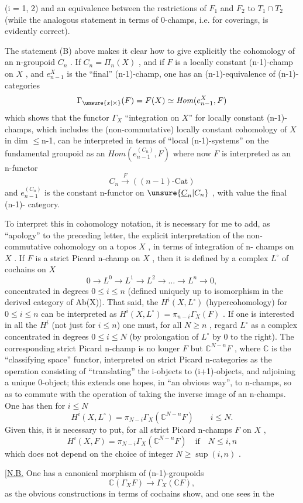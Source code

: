 
(i = 1, 2) and an equivalence between the restrictions of $F_1$ and $F_2$
to $T_1 \cap T_2$ (while the analogous statement in terms of 0-champs, i.e. for
coverings, is evidently correct).

The statement (B) above makes it clear how to give explicitly the
cohomology of an n-groupoid $C_n$ . If $C_n = \Pi_n(X)$ , and if $F$ is a locally
constant (n-1)-champ on $X$ , and $e^{X}_{n-1}$ is the ``final'' (n-1)-champ, one has
an (n-1)-equivalence of (n-1)-categories
\[ \Gamma_{\unsure{x|\times}}(F) = F(X) \simeq \mathit{Hom}(e^{X}_{n-1}, F) \]
which shows that the functor $\Gamma_X$ ``integration on $X$'' for locally constant
(n-1)-champs, which includes the (non-commutative) locally constant cohomology
of $X$ in dim $\leq$n-1, can be interpreted in terms of ``local (n-1)-systems''
on the fundamental groupoid as an
$\mathit{Hom}(e^{(C_n)}_{n-1} , F)$ where now $F$ is interpreted as an n-functor
\[ C_n \xrightarrow{\ F\ } ((n-1)\text{-Cat}) \]
and $e^{(C_n)}_{n-1}$ is the constant n-functor on $\unsure{\underline{C}_n|C_n}$ , with value the final (n-1)-
category.

To interpret this in cohomology notation, it is necessary for me to add,
as ``apology'' to the preceding letter, the explicit interpretation of the
non-commutative cohomology on a topos $X$ , in terms of integration of n-
champs on $X$ . If $F$ is a strict Picard n-champ on $X$ , then it is defined
by a complex $L^{\circ}$ of cochains on $X$
\[ 0 \to L^0 \to L^1 \to L^2 \to \ldots \to L^n \to 0 , \]
concentrated in degrees $0 \leq i \leq n$ (defined uniquely up to isomorphism in
the derived category of Ab(X)). That said, the $H^i(X, L^{\circ})$ (hypercohomology)
for $0 \leq i \leq n$ can be interpreted as $H^i(X, L^{\circ}) = \pi_{n-i}\Gamma_X(F)$ . If one is
interested in all the $H^i$ (not just for $i \leq n$) one must, for all $N \geq n$ ,
regard $L^{\circ}$ as a complex concentrated in degrees $0 \leq i \leq N$ (by prolongation
of $L^{\circ}$ by 0 to the right). The corresponding strict Picard n-champ is no
longer $F$ but $\mathbb{C}^{N-n}F$ , where $\mathbb{C}$ is the ``classifying space'' functor, interpreted
on strict Picard n-categories as the operation consisting of ``translating''
the i-objects to (i+1)-objects, and adjoining a unique 0-object; this extends
one hopes, in ``an obvious way'', to n-champs, so as to commute with the operation
of taking the inverse image of an n-champs. One has then for $i \leq N$
\[ H^i(X, L^{\circ}) = \pi_{N-i}\Gamma_X(\mathbb{C}^{N-n}F) \qquad i \leq N . \]
Given this, it is necessary to put, for all strict Picard n-champs $F$ on $X$ ,
\[ H^i(X, F) = \pi_{N-i}\Gamma_X(\mathbb{C}^{N-n}F) \quad \text{if} \quad N \leq i, n \]
which does not depend on the choice of integer $N \geq \sup(i, n)$ .

[\uline{N.B.} One has a canonical morphism of (n-1)-groupoids
\[ \mathbb{C}(\Gamma_X F) \longrightarrow \Gamma_X(\mathbb{C}F) , \]
as the obvious constructions in terms of cochains show, and one sees in the

